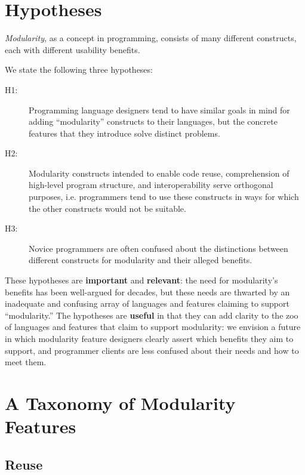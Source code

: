 \documentclass{sigplanconf}[10pt]
\begin{document}
\section{Hypotheses}

{\em Modularity}, as a concept in programming, consists of many different
constructs, each with different usability benefits.

We state the following three hypotheses:

\begin{description}
    \item[H1:] Programming language designers tend to have similar goals in mind for
      adding ``modularity'' constructs to their languages, but the concrete
      features that they introduce solve distinct problems.
    \item[H2:] Modularity constructs intended to enable code reuse,
      comprehension of high-level program structure, and interoperability
      serve orthogonal purposes, i.e. programmers tend to use these
      constructs in ways for which the other constructs would not be
      suitable.
    \item[H3:] Novice programmers are often confused about the
      distinctions between different constructs for modularity and their
      alleged benefits. 
\end{description}

These hypotheses are {\bf important} and {\bf relevant}: the need for
modularity's benefits has been well-argued for decades, but these needs are
thwarted by an inadequate and confusing array of languages and features
claiming to support ``modularity.'' The hypotheses are {\bf useful} in that
they can add clarity to the zoo of languages and features that claim to
support modularity: we envision a future in which modularity feature
designers clearly assert which benefits they aim to support, and programmer
clients are less confused about their needs and how to meet them. 
 


\section{A Taxonomy of Modularity Features}

\subsection{Reuse}
\end{document}
